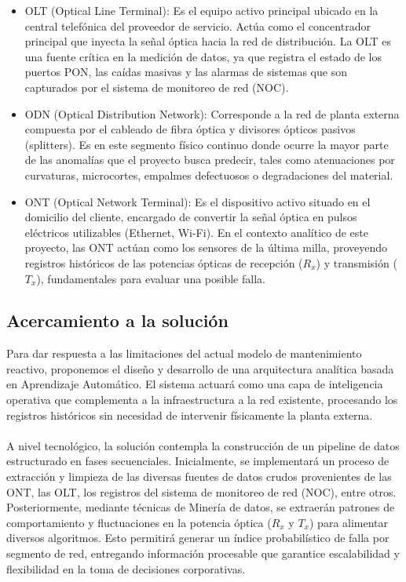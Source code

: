 \documentclass[12pt,a4paper]{article}
\begin{document}
    \begin{itemize}
        \item OLT (Optical Line Terminal): Es el equipo activo principal ubicado en la central telefónica del proveedor de servicio. Actúa como el concentrador principal que inyecta la señal
         óptica hacia la red de distribución. La OLT es una fuente crítica en la medición de datos, ya que registra el estado de los puertos PON, las caídas masivas y las alarmas de sistemas que son capturados por el
        sistema de monitoreo de red (NOC).
        \item ODN (Optical Distribution Network): Corresponde a la red de planta externa compuesta por el cableado de fibra óptica y divisores ópticos pasivos (splitters). Es en este segmento físico continuo
        donde ocurre la mayor parte de las anomalías que el proyecto busca predecir, tales como atenuaciones por curvaturas, microcortes, empalmes defectuosos o degradaciones del material.
        \item ONT (Optical Network Terminal): Es el dispositivo activo situado en el domicilio del cliente, encargado de convertir la señal óptica en pulsos eléctricos utilizables (Ethernet, Wi-Fi). En el contexto analítico de este proyecto, las ONT actúan como
        los sensores de la última milla, proveyendo registros históricos de las potencias ópticas de recepción ($R_x$) y transmisión ($T_x$), fundamentales para evaluar una posible falla.   
    \end{itemize}


    \subsection{Acercamiento a la solución}
    \noindent
    Para dar respuesta a las limitaciones del actual modelo de mantenimiento reactivo, proponemos el diseño y desarrollo de una arquitectura analítica basada en Aprendizaje Automático. El sistema actuará como una capa
    de inteligencia operativa que complementa a la infraestructura a la red existente, procesando los registros históricos sin necesidad de intervenir físicamente la planta externa.\\\\

    \noindent
    A nivel tecnológico, la solución contempla la construcción de un pipeline de datos estructurado en fases secuenciales. Inicialmente, se implementará un proceso de extracción y limpieza de las diversas fuentes de datos crudos
    provenientes de las ONT, las OLT, los registros del sistema de monitoreo de red (NOC), entre otros. Posteriormente, mediante técnicas de Minería de datos, se extraerán patrones de comportamiento y
    fluctuaciones en la potencia óptica ($R_x$ y $T_x$) para alimentar diversos algoritmos. Esto permitirá generar un índice probabilístico de falla por segmento de red, entregando información procesable que garantice escalabilidad y flexibilidad
    en la toma de decisiones corporativas.\\\\
    
\end{document}
